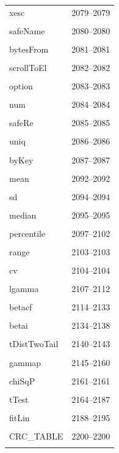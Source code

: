 {\begin{longtable}{@{}p{11cm}r@{}}
xesc & 2079--2079 \\\\\hline
safeName & 2080--2080 \\\\\hline
bytesFrom & 2081--2081 \\\\\hline
scrollToEl & 2082--2082 \\\\\hline
option & 2083--2083 \\\\\hline
num & 2084--2084 \\\\\hline
safeRe & 2085--2085 \\\\\hline
uniq & 2086--2086 \\\\\hline
byKey & 2087--2087 \\\\\hline
mean & 2092--2092 \\\\\hline
sd & 2094--2094 \\\\\hline
median & 2095--2095 \\\\\hline
percentile & 2097--2102 \\\\\hline
range & 2103--2103 \\\\\hline
cv & 2104--2104 \\\\\hline
lgamma & 2107--2112 \\\\\hline
betacf & 2114--2133 \\\\\hline
betai & 2134--2138 \\\\\hline
tDistTwoTail & 2140--2143 \\\\\hline
gammap & 2145--2160 \\\\\hline
chiSqP & 2161--2161 \\\\\hline
tTest & 2164--2187 \\\\\hline
fitLin & 2188--2195 \\\\\hline
CRC\_TABLE & 2200--2200 \\\\\hline

\end{longtable}}
